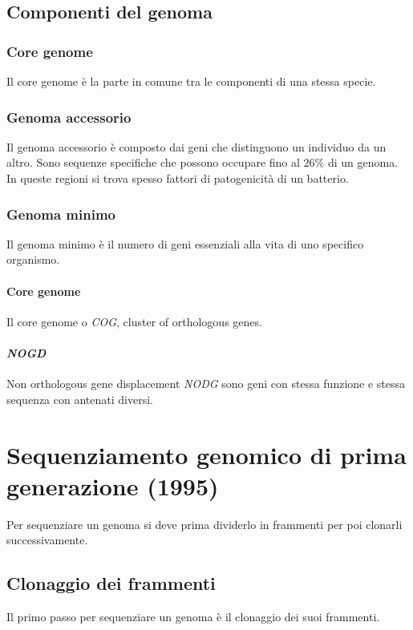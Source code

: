 	\subsection{Componenti del genoma}

		\subsubsection{Core genome}
		Il core genome \`e la parte in comune tra le componenti di una stessa specie.

		\subsubsection{Genoma accessorio}
		Il genoma accessorio \`e composto dai geni che distinguono un individuo da un altro.
		Sono sequenze specifiche che possono occupare fino al $26\%$ di un genoma.
		In queste regioni si trova spesso fattori di patogenicit\`a di un batterio.

		\subsubsection{Genoma minimo}
		Il genoma minimo \`e il numero di geni essenziali alla vita di uno specifico organismo. 

			\paragraph{Core genome}
			Il core genome o \emph{COG}, cluster of orthologous genes.

			\paragraph{\emph{NOGD}}
			Non orthologous gene displacement \emph{NODG} sono geni con stessa funzione e stessa sequenza con antenati diversi.

\section{Sequenziamento genomico di prima generazione (1995)}
Per sequenziare un genoma si deve prima dividerlo in frammenti per poi clonarli successivamente.
	\subsection{Clonaggio dei frammenti}
	Il primo passo per sequenziare un genoma \`e il clonaggio dei suoi frammenti.

